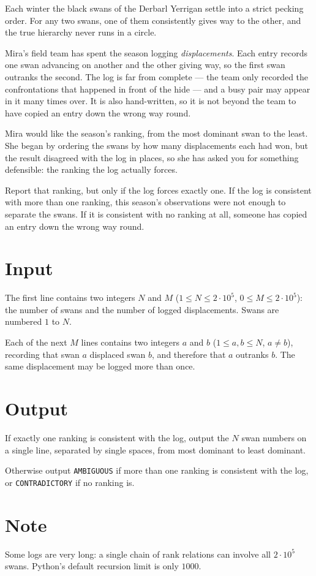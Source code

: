 
Each winter the black swans of the Derbarl Yerrigan settle into a strict
pecking order. For any two swans, one of them consistently gives way to the
other, and the true hierarchy never runs in a circle.

Mira's field team has spent the season logging \emph{displacements}. Each
entry records one swan advancing on another and the other giving way, so the
first swan outranks the second. The log is far from complete --- the team only
recorded the confrontations that happened in front of the hide --- and a busy
pair may appear in it many times over. It is also hand-written, so it is not
beyond the team to have copied an entry down the wrong way round.

Mira would like the season's ranking, from the most dominant swan to the
least. She began by ordering the swans by how many displacements each had won,
but the result disagreed with the log in places, so she has asked you for
something defensible: the ranking the log actually forces.

Report that ranking, but only if the log forces exactly one. If the log is
consistent with more than one ranking, this season's observations were not
enough to separate the swans. If it is consistent with no ranking at all,
someone has copied an entry down the wrong way round.

\section*{Input}
The first line contains two integers $N$ and $M$ ($1 \le N \le 2 \cdot 10^5$,
$0 \le M \le 2 \cdot 10^5$): the number of swans and the number of logged
displacements. Swans are numbered $1$ to $N$.

Each of the next $M$ lines contains two integers $a$ and $b$
($1 \le a, b \le N$, $a \ne b$), recording that swan $a$ displaced swan $b$,
and therefore that $a$ outranks $b$. The same displacement may be logged more
than once.

\section*{Output}
If exactly one ranking is consistent with the log, output the $N$ swan numbers
on a single line, separated by single spaces, from most dominant to least
dominant.

Otherwise output \texttt{AMBIGUOUS} if more than one ranking is consistent with
the log, or \texttt{CONTRADICTORY} if no ranking is.

\section*{Note}
Some logs are very long: a single chain of rank relations can involve all
$2 \cdot 10^5$ swans. Python's default recursion limit is only $1000$.
